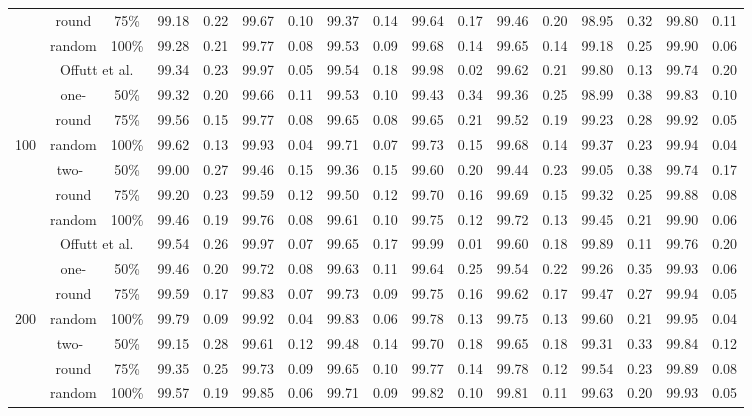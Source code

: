 \begin{table*}[t]
\begin{tabular}{|c||c|c||c|c||c|c||c|c||c|c||c|c||c|c||c|c|}
  \cline{3-17}
  ~&round&75\%&99.18&0.22&99.67&0.10&99.37&0.14&99.64&0.17&99.46&0.20&98.95&0.32&99.80&0.11\\
  \cline{3-17}
  ~&random&100\%&99.28&0.21&99.77&0.08&99.53&0.09&99.68&0.14&99.65&0.14&99.18&0.25&99.90&0.06\\
  \hline
  \hline
  ~&\multicolumn{2}{|c||}{Offutt et al.}&99.34&0.23&99.97&0.05&99.54&0.18&99.98&0.02&99.62&0.21&99.80&0.13&99.74&0.20\\
  \cline{2-17}
  ~&one-&50\%&99.32&0.20&99.66&0.11&99.53&0.10&99.43&0.34&99.36&0.25&98.99&0.38&99.83&0.10\\
  \cline{3-17}
  ~&round&75\%&99.56&0.15&99.77&0.08&99.65&0.08&99.65&0.21&99.52&0.19&99.23&0.28&99.92&0.05\\
  \cline{3-17}
  100&random&100\%&99.62&0.13&99.93&0.04&99.71&0.07&99.73&0.15&99.68&0.14&99.37&0.23&99.94&0.04\\
  \cline{2-17}
  ~&two-~&50\%&99.00&0.27&99.46&0.15&99.36&0.15&99.60&0.20&99.44&0.23&99.05&0.38&99.74&0.17\\
  \cline{3-17}
  ~&round&75\%&99.20&0.23&99.59&0.12&99.50&0.12&99.70&0.16&99.69&0.15&99.32&0.25&99.88&0.08\\
  \cline{3-17}
  ~&random&100\%&99.46&0.19&99.76&0.08&99.61&0.10&99.75&0.12&99.72&0.13&99.45&0.21&99.90&0.06\\
  \hline
  \hline
  ~&\multicolumn{2}{|c||}{Offutt et al.}&99.54&0.26&99.97&0.07&99.65&0.17&99.99&0.01&99.60&0.18&99.89&0.11&99.76&0.20\\
  \cline{2-17}
  ~&one-&50\%&99.46&0.20&99.72&0.08&99.63&0.11&99.64&0.25&99.54&0.22&99.26&0.35&99.93&0.06\\
  \cline{3-17}
  ~&round&75\%&99.59&0.17&99.83&0.07&99.73&0.09&99.75&0.16&99.62&0.17&99.47&0.27&99.94&0.05\\
  \cline{3-17}
  200&random&100\%&99.79&0.09&99.92&0.04&99.83&0.06&99.78&0.13&99.75&0.13&99.60&0.21&99.95&0.04\\
  \cline{2-17}
  ~&two-~&50\%&99.15&0.28&99.61&0.12&99.48&0.14&99.70&0.18&99.65&0.18&99.31&0.33&99.84&0.12\\
  \cline{3-17}
  ~&round&75\%&99.35&0.25&99.73&0.09&99.65&0.10&99.77&0.14&99.78&0.12&99.54&0.23&99.89&0.08\\
  \cline{3-17}
  ~&random&100\%&99.57&0.19&99.85&0.06&99.71&0.09&99.82&0.10&99.81&0.11&99.63&0.20&99.93&0.05\\
  \hline
\end{tabular}
\vspace{-4ex}
\end{table*}

